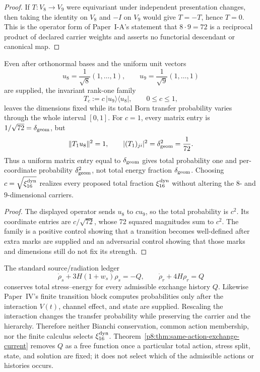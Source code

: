 \documentclass[12pt,a4paper]{article}
\begin{document}
\begin{proof}
If \(T:V_8\to V_9\) were equivariant under independent presentation changes,
then taking the identity on \(V_8\) and \(-I\) on \(V_9\) would give
\(T=-T\), hence \(T=0\).  This is the operator form of Paper~I-A's statement
that \(8\cdot9=72\) is a reciprocal product of declared carrier weights and
asserts no functorial descendant or canonical map.
\end{proof}

\begin{proposition}
\label{p8:prop:marked-uniform-eight-nine-counterfamily}
Even after orthonormal bases and the uniform unit vectors
\[
 u_8=\frac1{\sqrt8}(1,\ldots,1),
 \qquad
 u_9=\frac1{\sqrt9}(1,\ldots,1)
\]
are supplied, the invariant rank-one family
\[
 T_c:=c\,|u_9\rangle\langle u_8|,
 \qquad 0\leq c\leq1,
\]
leaves the dimensions fixed while its total Born transfer probability varies
through the whole interval \([0,1]\).  For \(c=1\), every matrix entry is
\(1/\sqrt{72}=\delta_{\rm geom}\), but
\[
 \|T_1u_8\|^2=1,
 \qquad
 |(T_1)_{ji}|^2=\delta_{\rm geom}^2=\frac1{72}.
\]
Thus a uniform matrix entry equal to \(\delta_{\rm geom}\) gives total
probability one and per-coordinate probability \(\delta_{\rm geom}^2\), not
total energy fraction \(\delta_{\rm geom}\).  Choosing
\(c=\sqrt{\xi_{16}^{\rm dyn}}\) realizes every proposed total fraction
\(\xi_{16}^{\rm dyn}\) without altering the \(8\)- and \(9\)-dimensional carriers.
\end{proposition}

\begin{proof}
The displayed operator sends \(u_8\) to \(cu_9\), so the total probability
is \(c^2\).  Its coordinate entries are \(c/\sqrt{72}\), whose 72 squared
magnitudes sum to \(c^2\).  The family is a positive control showing that a
transition becomes well-defined after extra marks are supplied and an
adversarial control showing that those marks and dimensions still do not fix
its strength.
\end{proof}

\begin{proposition}
\label{p8:prop:k16-conservation-does-not-select-xi}
The standard source/radiation ledger
\[
 \dot\rho_s+3H(1+w_s)\rho_s=-Q,
 \qquad
 \dot\rho_r+4H\rho_r=Q
\]
conserves total stress--energy for every admissible exchange history \(Q\).
Likewise Paper~IV's finite transition block computes probabilities only after
the interaction \(V(t)\), channel effect, and state are supplied.  Rescaling
the interaction changes the transfer probability while preserving the
carrier and the hierarchy.  Therefore neither Bianchi conservation, common
action membership, nor the finite calculus selects \(\xi_{16}^{\rm dyn}\).
Theorem~\ref{p8:thm:same-action-exchange-current} removes \(Q\) as a free
function once a particular total action, stress split, state, and solution
are fixed; it does not select which of the admissible actions or histories
occurs.
\end{proposition}
\end{document}
